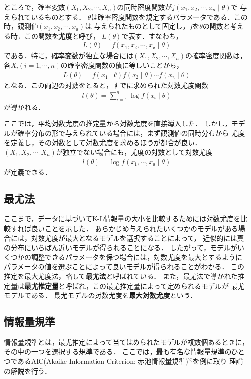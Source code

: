ところで，確率変数$(X_1, X_2, \cdots, X_n)$の同時密度関数が$f(x_1, x_2, \cdots, x_n \mid \theta)$で
与えられているものとする．
$\theta$は確率密度関数を規定するパラメータである．この時，観測値$(x_1, x_2, \cdots, x_n)$は
与えられたものとして固定し，$f$を$\theta$の関数と考える時，この関数を\textbf{尤度}と呼び，
$L(\theta)$で表す．すなわち，
\begin{align*}
  L(\theta) = f(x_1, x_2, \cdots, x_n \mid \theta)
\end{align*}
である．特に，確率変数が独立な場合には$(X_1, X_2, \cdots, X_n)$の確率密度関数は，
各$X_i (i = 1, \cdots, n)$の確率密度関数の積に等しいことから，
\begin{align*}
  L(\theta) = f(x_1 \mid \theta)f(x_2 \mid \theta) \cdots f(x_n \mid \theta)
\end{align*}
となる．この両辺の対数をとると，すでに求められた対数尤度関数
\begin{align*}
  l(\theta) = \sum_{i=1}^{n}\log f(x_i \mid \theta)
\end{align*}
が導かれる．

ここでは，平均対数尤度の推定量から対数尤度を直接導入した．
しかし，モデルが確率分布の形で与えられている場合には，まず観測値の同時分布から
尤度を定義し，その対数として対数尤度を求めるほうが都合が良い．
$(X_1, X_2, \cdots, X_n)$が独立でない場合にも，尤度の対数として対数尤度
\begin{align*}
  l(\theta) = \log f(x_1, \cdots, x_n \mid \theta)
\end{align*}
が定義できる．

\subsection{最尤法}
ここまで，データに基づいてK-L情報量の大小を比較するためには対数尤度を比較すれば良いことを示した．
あらかじめ与えられたいくつかのモデルがある場合には，対数尤度が最大となるモデルを選択することによって，
近似的には真の分布にいちばん近いモデルが得られることになる．
したがって，モデルがいくつかの調整できるパラメータを保つ場合には，対数尤度を最大とするように
パラメータの値を選ぶことによって良いモデルが得られることがわかる．
この推定を最大尤度法，略して\textbf{最尤法}と呼ばれている．
また，最尤法で導かれた推定量は\textbf{最尤推定量}と呼ばれ，この最尤推定量によって定められるモデルが
最尤モデルである．
最尤モデルの対数尤度を\textbf{最大対数尤度}という．

\subsection{情報量規準}
情報量規準とは，最尤推定によって当てはめられたモデルが複数個あるときに，その中の一つを選択する規準である．
ここでは，最も有名な情報量規準のひとつであるAIC(Akaike Information Criterion; 赤池情報量規準)$^{2)}$を例に取り
理論の解説を行う．

